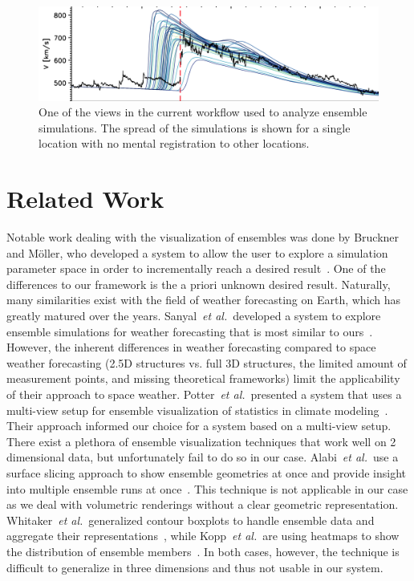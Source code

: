 \documentclass[journal]{vgtc}                %
\def\etal{\textit{et al.}}
\def\etal{\textit{et al.}}
\begin{document}
\begin{figure}
\newcommand{\abImageWidth}{\columnwidth}
\centering
\includegraphics[width=\abImageWidth]{figures/current_workflow_ensemble.png}
\caption{One of the views in the current workflow used to analyze ensemble simulations. The spread of the simulations is shown for a single location with no mental registration to other locations.}
\label{fig:currentworkflow:ensemble}
\end{figure}

\section{Related Work}
 Notable work dealing with the visualization of ensembles was done by Bruckner and M\"oller, who developed a system to allow the user to explore a simulation parameter space in order to incrementally reach a desired result~\cite{bruckner2010result}. One of the differences to our framework is the a priori unknown desired result. Naturally, many similarities exist with the field of weather forecasting on Earth, which has greatly matured over the years. Sanyal~\etal\ developed a system to explore ensemble simulations for weather forecasting that is most similar to ours~\cite{sanyal2010noodles}. However, the inherent differences in weather forecasting compared to space weather forecasting (2.5D structures vs. full 3D structures, the limited amount of measurement points, and missing theoretical frameworks) limit the applicability of their approach to space weather. Potter~\etal\ presented a system that uses a multi-view setup for ensemble visualization of statistics in climate modeling~\cite{potter2009ensemble}. Their approach informed our choice for a system based on a multi-view setup. There exist a plethora of ensemble visualization techniques that work well on 2 dimensional data, but unfortunately fail to do so in our case. Alabi~\etal\ use a surface slicing approach to show ensemble geometries at once and provide insight into multiple ensemble runs at once~\cite{alabi2012comparative}. This technique is not applicable in our case as we deal with volumetric renderings without a clear geometric representation. Whitaker~\etal\ generalized contour boxplots to handle ensemble data and aggregate their representations~\cite{whitaker2013contour}, while Kopp~\etal\ are using heatmaps to show the distribution of ensemble members~\cite{kopp2014decision}. In both cases, however, the technique is difficult to generalize in three dimensions and thus not usable in our system.
\end{document}
